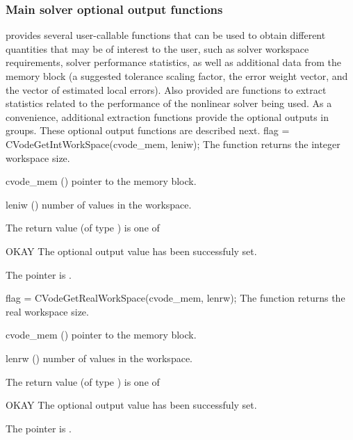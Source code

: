 \subsubsection{Main solver optional output functions}
{\cvodes} provides several user-callable functions that can be used to obtain
different quantities that may be of interest to the user, such as solver workspace
requirements, solver performance statistics, as well as additional data from
the {\cvodes} memory block (a suggested tolerance scaling factor, the error weight
vector, and the vector of estimated local errors). Also provided are functions to
extract statistics related to the performance of the {\cvodes} nonlinear solver
being used. As a convenience, additional extraction functions provide the optional 
outputs in groups.
These optional output functions are described next.
{
  flag = CVodeGetIntWorkSpace(cvode\_mem, leniw);
}
{
  The function  returns the
  {\cvodes} integer workspace size.
}
{
  \begin{args}
  \item[cvode\_mem] ()
    pointer to the {\cvodes} memory block.
  \item[leniw] ()
    number of  values in the {\cvodes} workspace.
  \end{args}
}
{
  The return value  (of type ) is one of
  \begin{args}
  \item[OKAY] 
    The optional output value has been successfuly set.
  \item[\Id{CVG\_NO\_MEM}]
    The  pointer is .
  \end{args}
}
{}
{
  flag = CVodeGetRealWorkSpace(cvode\_mem, lenrw);
}
{
  The function  returns the
  {\cvodes} real workspace size.
}
{
  \begin{args}
  \item[cvode\_mem] ()
    pointer to the {\cvodes} memory block.
  \item[lenrw] ()
    number of  values in the {\cvodes} workspace.
  \end{args}
}
{
  The return value  (of type ) is one of
  \begin{args}
  \item[OKAY] 
    The optional output value has been successfuly set.
  \item[\Id{CVG\_NO\_MEM}]
    The  pointer is .
  \end{args}
}
